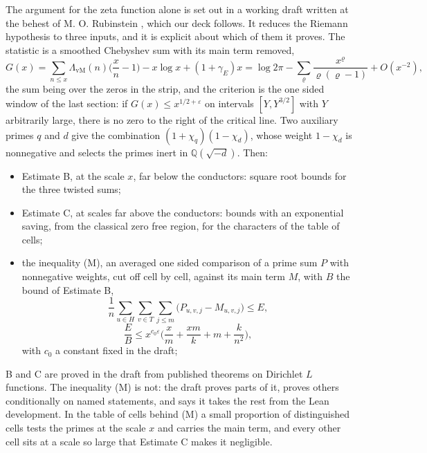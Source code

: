 The argument for the zeta function alone is set out in a working draft written at the behest of M. O. Rubinstein \cite{Rub26}, which our deck \cite{PS26m} follows. It reduces the Riemann hypothesis to three inputs, and it is explicit about which of them it proves. The statistic is a smoothed Chebyshev sum with its main term removed,
\[
G(x)=\sum_{n\le x}\Lambda_{\mathrm{vM}}(n)\Big(\frac xn-1\Big)-x\log x+(1+\gamma_E)x
=\log2\pi-\sum_{\varrho}\frac{x^{\varrho}}{\varrho(\varrho-1)}+O(x^{-2}),
\]
the sum being over the zeros in the strip, and the criterion is the one sided window of the last section: if $G(x)\le x^{1/2+\varepsilon}$ on intervals $[Y,Y^{3/2}]$ with $Y$ arbitrarily large, there is no zero to the right of the critical line. Two auxiliary primes $q$ and $d$ give the combination $(1+\chi_q)(1-\chi_d)$, whose weight $1-\chi_d$ is nonnegative and selects the primes inert in $\mathbb Q(\sqrt{-d})$. Then:
\begin{itemize}
\item Estimate B, at the scale $x$, far below the conductors: square root bounds for the three twisted sums;
\item Estimate C, at scales far above the conductors: bounds with an exponential saving, from the classical zero free region, for the characters of the table of cells;
\item the inequality (M), an averaged one sided comparison of a prime sum $P$ with nonnegative weights, cut off cell by cell, against its main term $M$, with $B$ the bound of Estimate B,
\[
\frac1n\sum_{u\in H}\sum_{v\in T}\sum_{j\le m}\big(P_{u,v,j}-M_{u,v,j}\big)\le E,
\]
\[
\frac EB\le x^{c_0\varepsilon}\Big(\frac xm+\frac{xm}{k}+m+\frac{k}{n^2}\Big),
\]
with $c_0$ a constant fixed in the draft;
\end{itemize}
B and C are proved in the draft from published theorems on Dirichlet $L$ functions. The inequality (M) is not: the draft proves parts of it, proves others conditionally on named statements, and says it takes the rest from the Lean development. In the table of cells behind (M) a small proportion of distinguished cells tests the primes at the scale $x$ and carries the main term, and every other cell sits at a scale so large that Estimate C makes it negligible.

